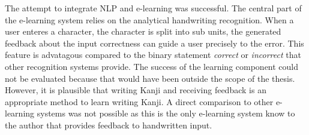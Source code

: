 The attempt to integrate NLP and e-learning was successful. The central part of
the e-learning system relies on the analytical handwriting recognition. 
When a user enteres a character, the character is split into sub units, 
the generated feedback about the input correctness can guide a user precisely 
to the error. This feature is advatagous compared to the binary statement 
\emph{correct} or \emph{incorrect} that other recognition systems provide.
The success of the learning component could not be evaluated because that would
have been outside the scope of the thesis. However, it is plausible that writing
Kanji and receiving feedback is an appropriate method to learn writing
Kanji. A direct comparison to other e-learning systems was not possible as this
is the only e-learning system know to the author that provides feedback to
handwritten input. 

